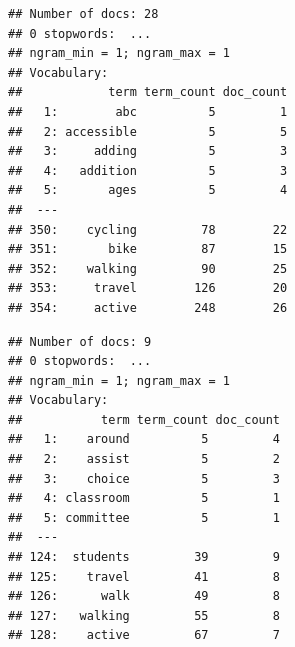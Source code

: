 \documentclass[]{elsarticle} %
\newenvironment{Shaded}{\begin{snugshade}}{\end{snugshade}}
\newcommand{\DataTypeTok}[1]{\textcolor[rgb]{0.13,0.29,0.53}{#1}}
\newcommand{\DecValTok}[1]{\textcolor[rgb]{0.00,0.00,0.81}{#1}}
\newcommand{\KeywordTok}[1]{\textcolor[rgb]{0.13,0.29,0.53}{\textbf{#1}}}
\newcommand{\NormalTok}[1]{#1}
\newcommand{\OperatorTok}[1]{\textcolor[rgb]{0.81,0.36,0.00}{\textbf{#1}}}
\newcommand{\OtherTok}[1]{\textcolor[rgb]{0.56,0.35,0.01}{#1}}
\newcommand{\StringTok}[1]{\textcolor[rgb]{0.31,0.60,0.02}{#1}}
\begin{document}
\begin{verbatim}
## Number of docs: 28 
## 0 stopwords:  ... 
## ngram_min = 1; ngram_max = 1 
## Vocabulary: 
##            term term_count doc_count
##   1:        abc          5         1
##   2: accessible          5         5
##   3:     adding          5         3
##   4:   addition          5         3
##   5:       ages          5         4
##  ---                                
## 350:    cycling         78        22
## 351:       bike         87        15
## 352:    walking         90        25
## 353:     travel        126        20
## 354:     active        248        26
\end{verbatim}

\begin{Shaded}
\end{Shaded}

\begin{verbatim}
## Number of docs: 9 
## 0 stopwords:  ... 
## ngram_min = 1; ngram_max = 1 
## Vocabulary: 
##           term term_count doc_count
##   1:    around          5         4
##   2:    assist          5         2
##   3:    choice          5         3
##   4: classroom          5         1
##   5: committee          5         1
##  ---                               
## 124:  students         39         9
## 125:    travel         41         8
## 126:      walk         49         8
## 127:   walking         55         8
## 128:    active         67         7
\end{verbatim}
\end{document}
